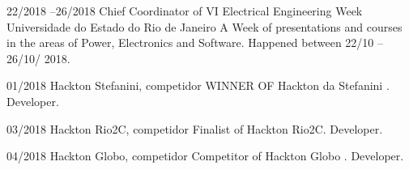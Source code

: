 \documentclass[]{friggeri-cv} %
\begin{document}
\begin{entrylist}
\entry
{22/2018 --26/2018}
{\hspace{.15cm} Chief Coordinator of VI Electrical Engineering Week }
{Universidade do Estado do Rio de Janeiro}
{A Week of presentations and courses in the areas of Power, Electronics and Software. Happened between  22/10 -- 26/10/ 2018.}

\entry
{01/2018}
{\hspace{.15cm}Hackton Stefanini, competidor}
{}
{WINNER OF Hackton da Stefanini . Developer.}

\entry
{03/2018 }
{\hspace{.15cm}Hackton Rio2C, competidor}
{}
{Finalist of Hackton Rio2C. Developer.}

\entry
{04/2018 }
{\hspace{.15cm}Hackton Globo, competidor}
{}
{Competitor of Hackton Globo . Developer.}



\end{entrylist}




\end{document}
